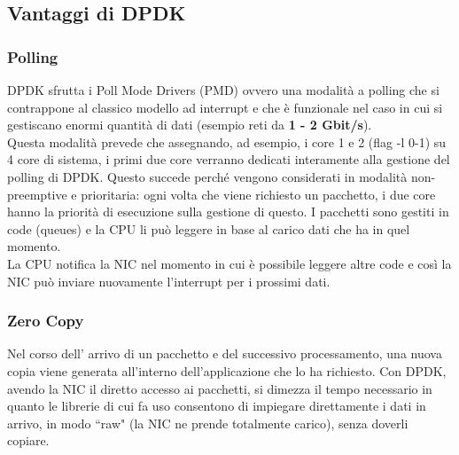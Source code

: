 \subsection*{Vantaggi di DPDK}

\vspace{2mm}
\subsubsection*{Polling}
DPDK sfrutta i Poll Mode Drivers (PMD) ovvero una modalità a polling che si contrappone al classico modello ad interrupt e che è funzionale nel caso in cui si gestiscano enormi quantità di dati (esempio reti da \textbf{1 - 2 Gbit/s}).\\
Questa modalità prevede che assegnando, ad esempio, i core 1 e 2 (flag -l 0-1) su 4 core di sistema, i primi due core verranno dedicati interamente alla gestione del polling di DPDK. Questo succede perché vengono considerati in modalità non-preemptive e prioritaria: ogni volta che viene richiesto un pacchetto, i due core hanno la priorità di esecuzione sulla gestione di questo.
I pacchetti sono gestiti in code (queues) e la CPU li può leggere in base al carico  dati che ha in quel momento.\\
La CPU notifica la NIC nel momento in cui è possibile leggere altre code e così la NIC può inviare nuovamente l'interrupt per i prossimi dati.

\vspace{2mm}
\subsubsection*{Zero Copy}
Nel corso dell' arrivo di un pacchetto e del successivo processamento, una nuova copia viene generata all'interno dell'applicazione che lo ha richiesto. Con DPDK, avendo la NIC il diretto accesso ai pacchetti, si dimezza il tempo necessario in quanto le librerie di cui fa uso consentono di impiegare direttamente i dati in arrivo, in modo ``raw" (la NIC ne prende totalmente carico), senza doverli copiare.

\vspace{2mm}
